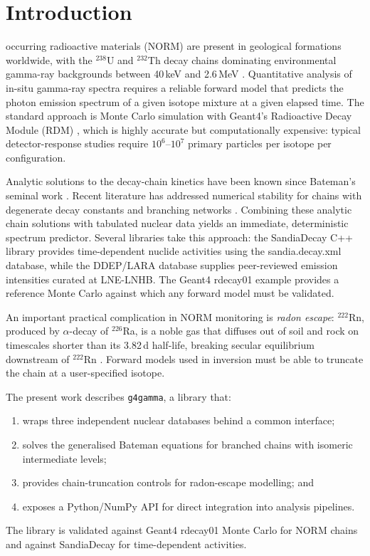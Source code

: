 \documentclass[journal]{IEEEtran}
\begin{document}
\section{Introduction}

 occurring radioactive materials (NORM) are present
in geological formations worldwide, with the $^{238}$U and $^{232}$Th decay
chains dominating environmental gamma-ray backgrounds between 40\,keV and
2.6\,MeV \cite{Michalik2023,Mueller2013}.
Quantitative analysis of in-situ gamma-ray spectra requires a reliable forward
model that predicts the photon emission spectrum of a given isotope mixture at
a given elapsed time.
The standard approach is Monte Carlo simulation with Geant4's Radioactive Decay
Module (RDM) \cite{Hauf2013rdm,Hauf2013validation}, which is highly accurate
but computationally expensive: typical detector-response studies require $10^6$--$10^7$
primary particles per isotope per configuration.

Analytic solutions to the decay-chain kinetics have been known since Bateman's
seminal work \cite{Bateman1910}.
Recent literature has addressed numerical stability for chains with degenerate
decay constants \cite{Pressyanov2002,Yuan2007,CruzLopez2024} and branching
networks \cite{Velhinho2023}.
Combining these analytic chain solutions with tabulated nuclear data yields an
immediate, deterministic spectrum predictor.
Several libraries take this approach: the SandiaDecay C++ library
\cite{SandiaDecay} provides time-dependent nuclide activities using the
sandia.decay.xml database, while the DDEP/LARA database \cite{Dulieu2017}
supplies peer-reviewed emission intensities curated at LNE-LNHB.
The Geant4 rdecay01 example \cite{Geant4} provides a reference Monte Carlo
against which any forward model must be validated.

An important practical complication in NORM monitoring is \emph{radon escape}:
$^{222}$Rn, produced by $\alpha$-decay of $^{226}$Ra, is a noble gas that
diffuses out of soil and rock on timescales shorter than its 3.82\,d half-life,
breaking secular equilibrium downstream of $^{222}$Rn
\cite{Nelson2015,Vengosh2021}.
Forward models used in inversion must be able to truncate the chain at a
user-specified isotope.

The present work describes \texttt{g4gamma}, a library that:
\begin{enumerate}
  \item wraps three independent nuclear databases behind a common interface;
  \item solves the generalised Bateman equations for branched chains with
        isomeric intermediate levels;
  \item provides chain-truncation controls for radon-escape modelling; and
  \item exposes a Python/NumPy API for direct integration into analysis pipelines.
\end{enumerate}
The library is validated against Geant4 rdecay01 Monte Carlo for NORM chains and
against SandiaDecay for time-dependent activities.
\end{document}
